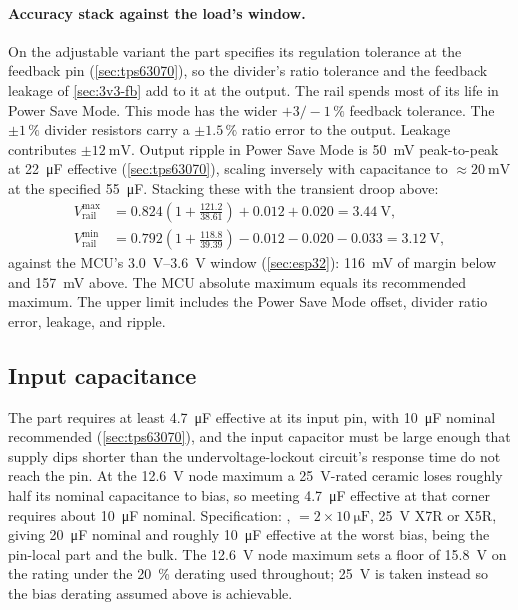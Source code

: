 \paragraph{Accuracy stack against the load's window.} On the adjustable variant
the part specifies its regulation tolerance at the feedback pin
(\cref{sec:tps63070}), so the divider's ratio tolerance and the feedback leakage
of \cref{sec:3v3-fb} add to it at the output. The rail spends
most of its life in Power Save Mode. This mode has the wider $+3/-1\,\%$
feedback tolerance. The $\pm1\,\%$ divider
resistors carry a $\pm1.5\,\%$ ratio error to the output. Leakage contributes
$\pm\SI{12}{\milli\volt}$. Output ripple in Power Save Mode is
\SI{50}{\milli\volt} peak-to-peak at \SI{22}{\micro\farad} effective
(\cref{sec:tps63070}), scaling inversely with capacitance to
$\approx\SI{20}{\milli\volt}$ at the specified \SI{55}{\micro\farad}. Stacking
these with the transient droop above:
\begin{align*}
  V_{\mathrm{rail}}^{\max} &= 0.824\left(1+\frac{121.2}{38.61}\right)
    + 0.012 + 0.020 = \SI{3.44}{\volt}, \\
  V_{\mathrm{rail}}^{\min} &= 0.792\left(1+\frac{118.8}{39.39}\right)
    - 0.012 - 0.020 - 0.033 = \SI{3.12}{\volt},
\end{align*}
against the MCU's \SIrange{3.0}{3.6}{\volt} window (\cref{sec:esp32}):
\SI{116}{\milli\volt} of margin below and \SI{157}{\milli\volt} above. The MCU
absolute maximum equals its recommended maximum. The upper limit includes the
Power Save Mode offset, divider ratio error, leakage, and ripple.

\subsection{Input capacitance}\label{sec:3v3-cin}

The part requires at least \SI{4.7}{\micro\farad} effective at its input pin,
with \SI{10}{\micro\farad} nominal recommended (\cref{sec:tps63070}), and the
input capacitor must be large enough that supply dips shorter than the
undervoltage-lockout circuit's response time do not reach the pin. At the
\SI{12.6}{\volt} node maximum a \SI{25}{\volt}-rated ceramic loses roughly half
its nominal capacitance to bias, so meeting \SI{4.7}{\micro\farad} effective at
that corner requires about \SI{10}{\micro\farad} nominal. Specification: ,
 $= 2\times\SI{10}{\micro\farad}$, \SI{25}{\volt} X7R or X5R, giving
\SI{20}{\micro\farad} nominal and roughly \SI{10}{\micro\farad} effective at the
worst bias,  being the pin-local part and  the bulk. The
\SI{12.6}{\volt} node maximum sets a floor of \SI{15.8}{\volt} on the rating
under the \SI{20}{\percent} derating used throughout; \SI{25}{\volt} is taken
instead so the bias derating assumed above is achievable.

